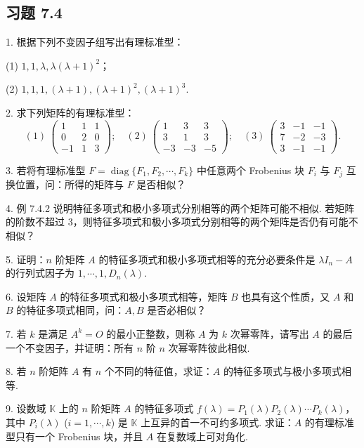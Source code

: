\documentclass[UTF8, 12pt, fontset=fandol, oneside]{ctexart}
\begin{document}
\subsection*{习题 7.4}

1. 根据下列不变因子组写出有理标准型：

(1) $1,1,\lambda,\lambda(\lambda+1)^2$；

(2) $1,1,1,(\lambda+1),(\lambda+1)^2,(\lambda+1)^3$.

2. 求下列矩阵的有理标准型：
\[
(1)\ \left(\begin{array}{ccc}
1 & 1 & 1\\
0 & 2 & 0\\
-1 & 1 & 3
\end{array}\right);\quad
(2)\ \left(\begin{array}{ccc}
1 & 3 & 3\\
3 & 1 & 3\\
-3 & -3 & -5
\end{array}\right);\quad
(3)\ \left(\begin{array}{ccc}
3 & -1 & -1\\
7 & -2 & -3\\
3 & -1 & -1
\end{array}\right).
\]

3. 若将有理标准型 $F=\operatorname{diag}\{F_1,F_2,\cdots,F_k\}$ 中任意两个 Frobenius 块 $F_i$ 与 $F_j$ 互换位置，问：所得的矩阵与 $F$ 是否相似？

4. 例 7.4.2 说明特征多项式和极小多项式分别相等的两个矩阵可能不相似. 若矩阵的阶数不超过 3，则特征多项式和极小多项式分别相等的两个矩阵是否仍有可能不相似？

5. 证明：$n$ 阶矩阵 $A$ 的特征多项式和极小多项式相等的充分必要条件是 $\lambda I_n-A$ 的行列式因子为 $1,\cdots,1,D_n(\lambda)$.

6. 设矩阵 $A$ 的特征多项式和极小多项式相等，矩阵 $B$ 也具有这个性质，又 $A$ 和 $B$ 的特征多项式相同，问：$A,B$ 是否必相似？

7. 若 $k$ 是满足 $A^k=O$ 的最小正整数，则称 $A$ 为 $k$ 次幂零阵，请写出 $A$ 的最后一个不变因子，并证明：所有 $n$ 阶 $n$ 次幂零阵彼此相似.

8. 若 $n$ 阶矩阵 $A$ 有 $n$ 个不同的特征值，求证：$A$ 的特征多项式与极小多项式相等.

9. 设数域 $\mathbb{K}$ 上的 $n$ 阶矩阵 $A$ 的特征多项式 $f(\lambda)=P_1(\lambda)P_2(\lambda)\cdots P_k(\lambda)$，其中 $P_i(\lambda)$ ($i=1,\cdots,k$) 是 $\mathbb{K}$ 上互异的首一不可约多项式. 求证：$A$ 的有理标准型只有一个 Frobenius 块，并且 $A$ 在复数域上可对角化.
\end{document}
